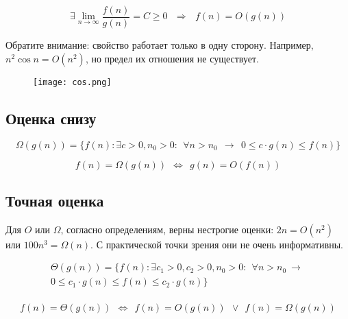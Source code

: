 
\begin{property}
$$
\boxed{
  \exists \lim_{n\to\infty} \frac{f(n)}{g(n)} = C \geqslant 0   ~~~\Rightarrow~~~   f(n) = O(g(n))
}
$$
\end{property}


Обратите внимание: свойство работает только в одну сторону. Например, $n^2\cos n = O(n^2)$, но предел их отношения не существует.

\begin{figure}[!ht]
\centering
\texttt{[image: cos.png]}
\end{figure}

\subsection*{Оценка снизу}

$$
\Omega(g(n)) = \{f(n) : \exists c>0, n_0>0:~~ \forall n > n_0 ~~\to~~ 0 \leqslant c \cdot g(n) \leqslant f(n)\}
$$

\begin{property}
$$
f(n) = \Omega(g(n))   ~~\Leftrightarrow~~  g(n) = O(f(n))
$$
\end{property}


\subsection*{Точная оценка}

Для $O$ или $\Omega$, согласно определениям, верны нестрогие оценки: $2n = O(n^2)$ или $100n^3 = \Omega(n)$. С практической точки зрения они не очень информативны.

\begin{definition}
$$
  \begin{gathered}
  \Theta(g(n)) = \{f(n) : \exists c_1>0, c_2>0, n_0>0:~~ \forall n > n_0 ~\to~\\
  0 \leqslant c_1 \cdot g(n) \leqslant f(n) \leqslant c_2 \cdot g(n)\} \\
  \end{gathered}
$$
\end{definition}

\begin{definition}[альтернативное]
$$
  f(n) = \Theta(g(n)) ~~\Leftrightarrow~~  f(n) = O(g(n)) ~~\vee~~ f(n) = \Omega(g(n))
$$
\end{definition}

